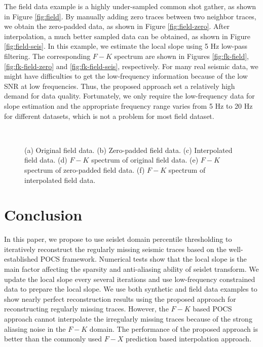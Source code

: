 The field data example is a highly under-sampled common shot gather, as shown in Figure \ref{fig:field}. By manually adding zero traces between two neighbor traces, we obtain the zero-padded data, as shown in Figure \ref{fig:field-zero}. After interpolation, a much better sampled data can be obtained, as shown in Figure \ref{fig:field-seis}. In this example, we estimate the local slope using 5 Hz low-pass filtering. The corresponding $F-K$ spectrum are shown in Figures \ref{fig:fk-field}, \ref{fig:fk-field-zero} and \ref{fig:fk-field-seis}, respectively. For many real seismic data, we might have difficulties to get the low-frequency information because of the low SNR at low frequencies. Thus, the proposed approach set a relatively high demand for data quality. Fortunately, we only require the low-frequency data for slope estimation and the appropriate frequency range varies from 5 Hz to 20 Hz for different datasets, which is not a problem for most field dataset.

\begin{figure}[htb!]
  \centering
    \\
	\caption{(a) Original field data. (b) Zero-padded field data. (c) Interpolated field data. (d) $F-K$ spectrum of original field data. (e) $F-K$ spectrum of zero-padded field data. (f) $F-K$ spectrum of interpolated field data.}
   \label{fig:field,field-zero,field-seis,fk-field,fk-field-zero,fk-field-seis}
\end{figure}

\section{Conclusion}
In this paper, we propose to use seislet domain percentile thresholding to iteratively reconstruct the regularly missing seismic traces based on the well-established POCS framework. Numerical tests show that the local slope is the main factor affecting the sparsity and anti-aliasing ability of seislet transform. %
We update the local slope every several iterations and use low-frequency constrained data to prepare the local slope. We use both synthetic and field data examples to show nearly perfect reconstruction results using the proposed approach for reconstructing regularly missing traces. However, the $F-K$ based POCS approach cannot interpolate the irregularly missing traces because of the strong aliasing noise in the $F-K$ domain. The performance of the proposed approach is better than the commonly used $F-X$ prediction based interpolation approach. 
 

